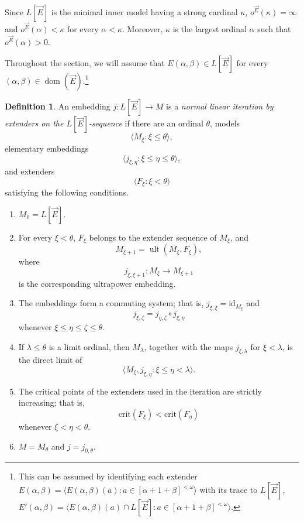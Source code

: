 \documentclass{article}
\theoremstyle{definition}
\newtheorem{definition}{Definition}[section]
\theoremstyle{plain}
\newcommand{\la}{\langle}
\newcommand{\ra}{\rangle}
\DeclareMathOperator{\dom}{dom}
\DeclareMathOperator{\Ult}{ult}
\begin{document}
Since $L[\vec{E}]$ is the minimal inner model having a strong cardinal $\kappa$, $o^{\vec E}(\kappa)=\infty$ and $o^{\vec E}(\alpha)<\kappa$ for every
$\alpha<\kappa$. Moreover, $\kappa$ is the largest ordinal $\alpha$ such that $o^{\vec E}(\alpha)>0$.

Throughout the section, we will assume that $E(\alpha,\beta)\in L[\vec{E}]$ for every $(\alpha,\beta)\in \dom(\vec{E})$.\footnote{This can be assumed by identifying each extender $E(\alpha,\beta) = \la E(\alpha,\beta)(a) \colon a\in [\alpha+1+\beta]^{<\omega} \ra$ with its trace to $L[\vec{E}]$,  $E'(\alpha,\beta) = \la E(\alpha,\beta)(a)\cap L[\vec{E}] \colon a\in [\alpha+1+\beta]^{<\omega} \ra$.}


\begin{definition}\label{Def:NormalIterates}
An embedding $j\colon L[\vec E]\to M$ is a \textit{normal linear
iteration by extenders on the $L[\vec E]$-sequence} if there are an
ordinal $\theta$, models
$$\langle M_\xi\colon \xi\leq\theta\rangle,$$
elementary embeddings
$$\langle j_{\xi,\eta}\colon \xi\leq\eta\leq\theta\rangle,$$
and extenders
$$\langle F_\xi\colon \xi<\theta\rangle$$
satisfying the following conditions.

\begin{enumerate}
    \item $M_0=L[\vec E]$.

    \item For every $\xi<\theta$, $F_\xi$ belongs to the extender
    sequence of $M_\xi$, and
    \[
    M_{\xi+1}=\Ult(M_\xi,F_\xi),
    \]
    where
    \[
    j_{\xi,\xi+1}\colon M_\xi\to M_{\xi+1}
    \]
    is the corresponding ultrapower embedding.

    \item The embeddings form a commuting system; that is,
    $j_{\xi,\xi}=\text{id}_{M_\xi}$ and
    \[
    j_{\xi,\zeta}
    =
    j_{\eta,\zeta}\circ j_{\xi,\eta}
    \]
    whenever $\xi\leq\eta\leq\zeta\leq\theta$.

    \item If $\lambda\leq\theta$ is a limit ordinal, then $M_\lambda$,
    together with the maps $j_{\xi,\lambda}$ for $\xi<\lambda$, is the
    direct limit of
    \[
    \langle M_\xi,j_{\xi,\eta}\colon \xi\leq\eta<\lambda\rangle.
    \]

    \item The critical points of the extenders used in the iteration are
    strictly increasing; that is,
    \[
    \text{crit}(F_\xi)<\text{crit}(F_\eta)
    \]
    whenever $\xi<\eta<\theta$.

    \item $M=M_\theta$ and $j=j_{0,\theta}$.
\end{enumerate}
\end{definition}
\end{document}
